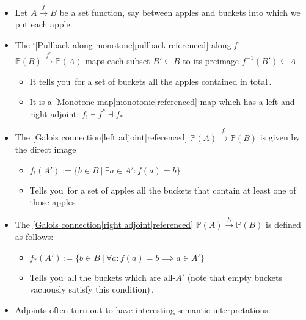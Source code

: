

\begin{itemize}
    \item Let $A \xrightarrow{f} B$ be a set function, say between apples and buckets into which we put each apple.
    \item The `\ref{Pullback along monotone|pullback|referenced} along \emph{f}' $\mathbb{P}(B) \xrightarrow{f^*} \mathbb{P}(A)$ maps each subset $B' \subseteq B$ to its preimage $f^{-1}(B') \subseteq A$
          \begin{itemize}
            \item It tells you \,for a set of buckets all the apples contained in total\,.
            \item It is a \ref{Monotone map|monotonic|referenced} map which has a left and right adjoint: $f_! \dashv f^* \dashv f_*$
          \end{itemize}
    \item The \ref{Galois connection|left adjoint|referenced} $\mathbb{P}(A)\xrightarrow{f_!}\mathbb{P}(B)$ is given by the direct image
          \begin{itemize}
            \item $f_!(A') := \{b \in B\ |\ \exists a \in A': f(a)=b\}$
            \item Tells you \,for a set of apples all the buckets that contain at least one of those apples\,.
          \end{itemize}
    \item The \ref{Galois connection|right adjoint|referenced} $\mathbb{P}(A) \xrightarrow{f_*} \mathbb{P}(B)$ is defined as follows:
          \begin{itemize}
            \item  $f_*(A') := \{b \in B\ |\ \forall a: f(a)=b \implies a \in A'\}$
            \item Tells you \,all the buckets which are all-$A\prime$ (note that empty buckets vacuously satisfy this condition)\,.
          \end{itemize}
    \item Adjoints often turn out to have interesting semantic interpretations.
  \end{itemize}